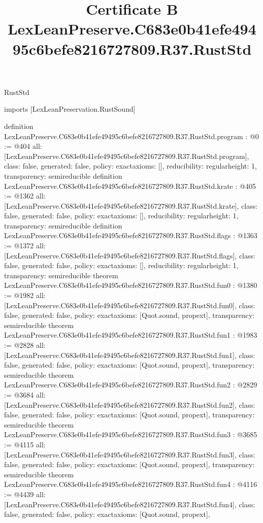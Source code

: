 \begin{lexlean}{RustStd}
\title{Certificate B LexLeanPreserve.C683e0b41efe49495c6befe8216727809.R37.RustStd}
\begin{coremodule}
imports [LexLeanPreservation.RustSound]

definition LexLeanPreserve.C683e0b41efe49495c6befe8216727809.R37.RustStd.program : @0 := @404 {
  all: [LexLeanPreserve.C683e0b41efe49495c6befe8216727809.R37.RustStd.program],
  class: false,
  generated: false,
  policy: exact{axioms: []},
  reducibility: regular{height: 1},
  transparency: semireducible
}
definition LexLeanPreserve.C683e0b41efe49495c6befe8216727809.R37.RustStd.krate : @405 := @1362 {
  all: [LexLeanPreserve.C683e0b41efe49495c6befe8216727809.R37.RustStd.krate],
  class: false,
  generated: false,
  policy: exact{axioms: []},
  reducibility: regular{height: 1},
  transparency: semireducible
}
definition LexLeanPreserve.C683e0b41efe49495c6befe8216727809.R37.RustStd.flags : @1363 := @1372 {
  all: [LexLeanPreserve.C683e0b41efe49495c6befe8216727809.R37.RustStd.flags],
  class: false,
  generated: false,
  policy: exact{axioms: []},
  reducibility: regular{height: 1},
  transparency: semireducible
}
theorem LexLeanPreserve.C683e0b41efe49495c6befe8216727809.R37.RustStd.fun0 : @1380 := @1982 {
  all: [LexLeanPreserve.C683e0b41efe49495c6befe8216727809.R37.RustStd.fun0],
  class: false,
  generated: false,
  policy: exact{axioms: [Quot.sound, propext]},
  transparency: semireducible
}
theorem LexLeanPreserve.C683e0b41efe49495c6befe8216727809.R37.RustStd.fun1 : @1983 := @2828 {
  all: [LexLeanPreserve.C683e0b41efe49495c6befe8216727809.R37.RustStd.fun1],
  class: false,
  generated: false,
  policy: exact{axioms: [Quot.sound, propext]},
  transparency: semireducible
}
theorem LexLeanPreserve.C683e0b41efe49495c6befe8216727809.R37.RustStd.fun2 : @2829 := @3684 {
  all: [LexLeanPreserve.C683e0b41efe49495c6befe8216727809.R37.RustStd.fun2],
  class: false,
  generated: false,
  policy: exact{axioms: [Quot.sound, propext]},
  transparency: semireducible
}
theorem LexLeanPreserve.C683e0b41efe49495c6befe8216727809.R37.RustStd.fun3 : @3685 := @4115 {
  all: [LexLeanPreserve.C683e0b41efe49495c6befe8216727809.R37.RustStd.fun3],
  class: false,
  generated: false,
  policy: exact{axioms: [Quot.sound, propext]},
  transparency: semireducible
}
theorem LexLeanPreserve.C683e0b41efe49495c6befe8216727809.R37.RustStd.fun4 : @4116 := @4439 {
  all: [LexLeanPreserve.C683e0b41efe49495c6befe8216727809.R37.RustStd.fun4],
  class: false,
  generated: false,
  policy: exact{axioms: [Quot.sound, propext]},
}
\end{coremodule}
\end{lexlean}
